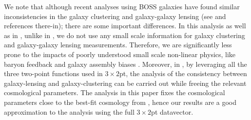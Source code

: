 \documentclass[aps, prd,twocolumn,superscriptaddress,nofootinbib,preprintnumbers]{revtex4-1}
\newcommand{\redmagic}{\texttt{redMaGiC} }
\newcommand{\IR}[1]{{\color{red}[\textbf{Note for IR}: #1]}}
\begin{document}
We note that although recent analyses using BOSS galaxies have found similar inconsistencies in the galaxy clustering and galaxy-galaxy lensing (see \citep{Leauthaud_2017, Lange_2021} and references there-in); there are some important differences. In this analysis as well as in \citet{y3-3x2ptkp}, unlike in \citep{Leauthaud_2017}, we do not use any small scale information for galaxy clustering and galaxy-galaxy lensing measurements. Therefore, we are significantly less prone to the impacts of poorly understood small scale non-linear physics, like baryon feedback and galaxy assembly biases \citep{Yuan_2020, Amodeo_2021, zu2020lensing}. Moreover, in \citet{y3-3x2ptkp}, by leveraging all the three two-point functions used in $3\times2$pt, the analysis of the consistency between galaxy-lensing and galaxy-clustering can be carried out while freeing the relevant cosmological parameters. The analysis in this paper fixes the cosmological parameters close to the best-fit cosmology from \citet{y3-3x2ptkp}, hence our results are a good approximation to the analysis using the full $3\times2$pt datavector.

\end{document}
